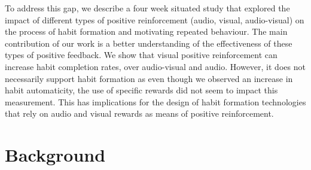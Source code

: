 \documentclass{scaffold/sigchi}
\begin{document}


To address this gap, we describe a four week situated study that explored the impact of different types of positive reinforcement (audio, visual, audio-visual) on the process of habit formation and motivating repeated behaviour. The main contribution of our work is a better understanding of the effectiveness of these types of positive feedback. We show that visual positive reinforcement can increase habit completion rates, over audio-visual and audio. However, it does not necessarily support habit formation as even though we observed an increase in habit automaticity, the use of specific rewards did not seem to impact this measurement. This has implications for the design of habit formation technologies that rely on audio and visual rewards as means of positive reinforcement.

\section{Background}
\end{document}

